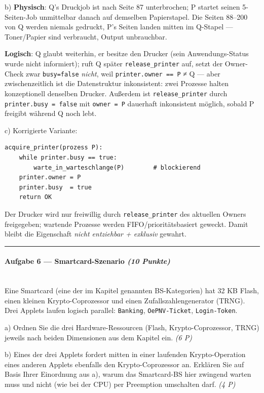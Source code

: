 \documentclass[11pt, a4paper]{article}
\begin{document}
b) \textbf{Physisch}: Q's Druckjob ist nach Seite 87 unterbrochen; P startet seinen 5-Seiten-Job unmittelbar danach auf demselben Papierstapel. Die Seiten 88–200 von Q werden niemals gedruckt, P's Seiten landen mitten im Q-Stapel — Toner/Papier sind verbraucht, Output unbrauchbar.

\textbf{Logisch}: Q glaubt weiterhin, er besitze den Drucker (sein Anwendungs-Status wurde nicht informiert); ruft Q später \texttt{release\_printer} auf, setzt der Owner-Check zwar \texttt{busy=false} \textit{nicht}, weil \texttt{printer.owner == P} ≠ Q — aber zwischenzeitlich ist die Datenstruktur inkonsistent: zwei Prozesse halten konzeptionell denselben Drucker. Außerdem ist \texttt{release\_printer} durch \texttt{printer.busy = false} mit \texttt{owner = P} dauerhaft inkonsistent möglich, sobald P freigibt während Q noch lebt.


c) Korrigierte Variante:


\begin{lstlisting}
acquire_printer(prozess P):
    while printer.busy == true:
        warte_in_warteschlange(P)        # blockierend
    printer.owner = P
    printer.busy  = true
    return OK
\end{lstlisting}


Der Drucker wird nur freiwillig durch \texttt{release\_printer} des aktuellen Owners freigegeben; wartende Prozesse werden FIFO/prioritätsbasiert geweckt. Damit bleibt die Eigenschaft \textit{nicht entziehbar + exklusiv} gewahrt.



\noindent\textcolor{rulegray}{\rule{\linewidth}{0.4pt}}


\paragraph{Aufgabe 6 — Smartcard-Szenario \textit{(10 Punkte)}}\mbox{}\\[2pt]

Eine Smartcard (eine der im Kapitel genannten BS-Kategorien) hat 32 KB Flash, einen kleinen Krypto-Coprozessor und einen Zufallszahlengenerator (TRNG). Drei Applets laufen logisch parallel: \texttt{Banking}, \texttt{OePNV-Ticket}, \texttt{Login-Token}.


a) Ordnen Sie die drei Hardware-Ressourcen (Flash, Krypto-Coprozessor, TRNG) jeweils nach beiden Dimensionen aus dem Kapitel ein. \textit{(6 P)}


b) Eines der drei Applets fordert mitten in einer laufenden Krypto-Operation eines anderen Applets ebenfalls den Krypto-Coprozessor an. Erklären Sie auf Basis Ihrer Einordnung aus a), warum das Smartcard-BS hier zwingend warten muss und nicht (wie bei der CPU) per Preemption umschalten darf. \textit{(4 P)}
\end{document}
